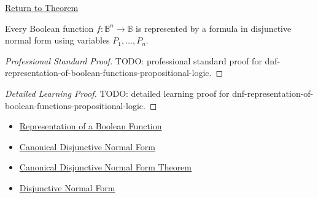 \newpage
{}
\label{prf:dnf-representation-of-boolean-functions-propositional-logic}

\begin{remark*}[Return]
\hyperref[thm:dnf-representation-of-boolean-functions-propositional-logic]{Return to Theorem}
\end{remark*}

\begin{theorem*}
Every Boolean function \(f:\mathbb{B}^n\to\mathbb{B}\) is represented by a
formula in disjunctive normal form using variables \(P_1,\ldots,P_n\).
\end{theorem*}

\begin{proof}[Professional Standard Proof]
\LRAProofBodyStart
TODO: professional standard proof for dnf-representation-of-boolean-functions-propositional-logic.
\end{proof}

\begin{proof}[Detailed Learning Proof]
\LRAProofBodyStart
TODO: detailed learning proof for dnf-representation-of-boolean-functions-propositional-logic.
\end{proof}

\begin{remark*}
\end{remark*}

\begin{dependencies}
\begin{itemize}
  \item \hyperref[def:boolean-function-representation-propositional-logic]{Representation of a Boolean Function}
  \item \hyperref[def:canonical-disjunctive-normal-form-propositional-logic]{Canonical Disjunctive Normal Form}
  \item \hyperref[thm:canonical-disjunctive-normal-form-propositional-logic]{Canonical Disjunctive Normal Form Theorem}
  \item \hyperref[def:disjunctive-normal-form-propositional-logic]{Disjunctive Normal Form}
\end{itemize}
\end{dependencies}

\clearpage
